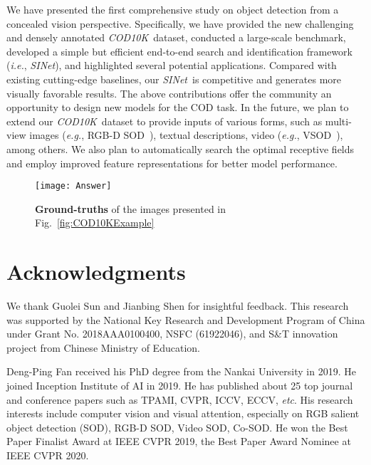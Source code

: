 \documentclass[10pt,journal,compsoc]{IEEEtran}
\def\ie{\emph{i.e.}}
\def\eg{\emph{e.g.}}
\def\etc{\emph{etc}}
\newcommand{\figref}[1]{Fig.~\ref{#1}}
\def\ourdataset{\textit{COD10K}}
\def\ournewmodel{\emph{SINet}}
\begin{document}
We have presented the first comprehensive study on object detection from 
a concealed vision perspective.
Specifically, we have provided the new challenging and densely annotated
\ourdataset~dataset, conducted a large-scale benchmark,
developed a simple but efficient end-to-end search and identification 
framework (\ie, \ournewmodel),
and highlighted several potential applications.
Compared with existing cutting-edge baselines, our \ournewmodel~is
competitive and generates more visually favorable results.
The above contributions offer the community an opportunity to design 
new models for the COD task.
In the future, we plan to extend our \ourdataset~dataset to provide 
inputs of various forms, such as multi-view images 
(\eg, RGB-D SOD~\cite{fu2021siamese,zhang2021uncertainty}), 
textual descriptions, video (\eg, VSOD~\cite{fan2019shifting}), among others.
We also plan to automatically search the optimal receptive fields 
\cite{gao2021global2local} and employ improved feature representations 
\cite{gao2021rbn} for better model performance.

\begin{figure}[t!]
  \centering
  \texttt{[image: Answer]}\\
  \vspace{-12pt}
  \caption{\textbf{Ground-truths} of the images presented in 
    \figref{fig:COD10KExample}
  }\label{fig:Answer}
\end{figure}

\section*{Acknowledgments}
We thank Guolei Sun and Jianbing Shen for insightful feedback.
This research was supported by the 
National Key Research and Development Program of China
under Grant No. 2018AAA0100400, NSFC (61922046), 
and S\&T innovation project from Chinese Ministry of Education.



\ifCLASSOPTIONcaptionsoff
  \newpage
\fi



{


}

\vspace{-.5in}
\begin{IEEEbiography}
{Deng-Ping Fan} received his PhD degree from the Nankai University in 2019.
He joined Inception Institute of AI in 2019.
He has published about 25 top journal and conference papers such as TPAMI, CVPR, ICCV, ECCV, \etc. 
His research interests include computer vision and visual attention, especially on 
RGB salient object detection (SOD), RGB-D SOD, Video SOD, Co-SOD. 
He won the Best Paper Finalist Award at IEEE CVPR 2019, 
the Best Paper Award Nominee at IEEE CVPR 2020.
\end{IEEEbiography}
\vspace{-.5in}
\end{document}
